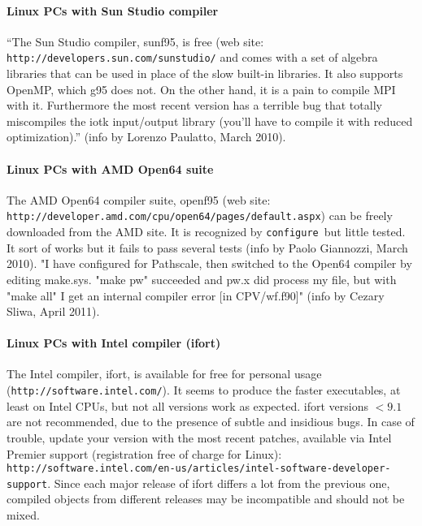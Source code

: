 \documentclass[12pt,a4paper]{article}
\def\configure{\texttt{configure}}
\begin{document}
\paragraph{Linux PCs with Sun Studio compiler}

``The Sun Studio compiler, sunf95, is free (web site:
\texttt{http://developers.sun.com/sunstudio/} and comes  
with a set of algebra libraries that can be used in place of the slow 
built-in libraries. It also supports OpenMP, which g95 does not. On the 
other hand, it is a pain to compile MPI with it. Furthermore the most
recent version has a terrible bug that totally miscompiles the iotk 
input/output library (you'll have to compile it with reduced optimization).''
(info by Lorenzo Paulatto, March 2010).

\paragraph{Linux PCs with AMD Open64 suite}

The AMD Open64 compiler suite, openf95 (web site:
\texttt{http://developer.amd.com/cpu/open64/pages/default.aspx})
can be freely downloaded from the AMD site.
It is recognized by \configure\ but little tested. It sort of works 
but it fails to pass several tests (info by Paolo Giannozzi, March 2010).
"I have configured for Pathscale, then switched to the Open64 compiler by 
editing make.sys. "make pw" succeeded and pw.x did process my file, but with 
"make all" I get an internal compiler error [in CPV/wf.f90]" (info by Cezary 
Sliwa, April 2011).

\paragraph{Linux PCs with Intel compiler (ifort)}

The Intel compiler, ifort, is available for free for personal 
usage (\texttt{http://software.intel.com/}). It seems to produce 
the faster executables, 
at least on Intel CPUs, but not all versions work as expected.
ifort versions $<9.1$ are not recommended, due to the presence of subtle 
and insidious bugs. In case of trouble, update your version with 
the most recent patches,
available via Intel Premier support (registration free of charge for Linux):
\texttt{http://software.intel.com/en-us/articles/intel-software-developer-support}.
Since each major release of ifort
differs a lot from the previous one, compiled objects from different 
releases may be incompatible and should not be mixed.    
\end{document}
